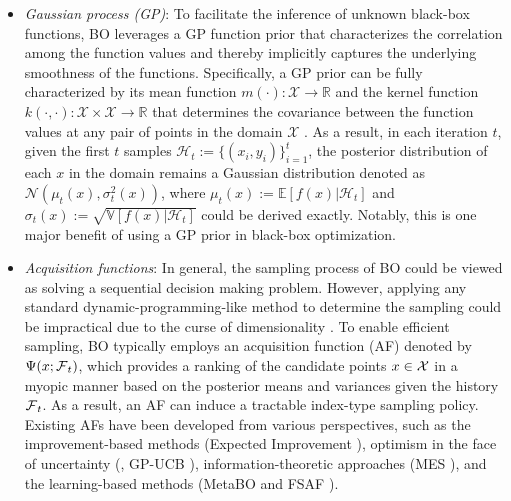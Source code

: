 \begin{itemize}[leftmargin=*]
\item \textit{Gaussian process (GP)}: To facilitate the inference of unknown black-box functions, BO leverages a GP function prior that characterizes the correlation among the function values and thereby implicitly captures the underlying smoothness of the functions. Specifically, a GP prior can be fully characterized by its mean function $m(\cdot): \mathcal{X}\rightarrow \mathbb{R}$ and the kernel function $k(\cdot,\cdot): \mathcal{X}\times \mathcal{X} \rightarrow \mathbb{R}$ that determines the covariance between the function values at any pair of points in the domain $\mathcal{X}$ \citep{schulz2018tutorial}. As a result, in each iteration $t$, given the first $t$ samples $\mathcal{H}_t:=\{(x_i,y_i)\}_{i=1}^{t}$, the posterior distribution of each $x$ in the domain remains a Gaussian distribution denoted as $\mathcal{N}(\mu_t(x),\sigma^2_t(x))$, where $\mu_t(x):=\mathbb{E}[f(x)\rvert \mathcal{H}_t]$ and $\sigma_t(x):=\sqrt{\mathbb{V}[f(x)\rvert \mathcal{H}_t]}$ could be derived exactly.
Notably, this is one major benefit of using a GP prior in black-box optimization.
\vspace{-1mm}
\item \textit{Acquisition functions}: In general, the sampling process of BO could be viewed as solving a sequential decision making problem. However, applying any standard dynamic-programming-like method to determine the sampling could be impractical due to the curse of dimensionality \citep{wang2016bayesian}. To enable efficient sampling, BO typically employs an acquisition function (AF) denoted by $\Psi(x; \operatorname{\mathcal{F}}_t)$, which provides a ranking of the candidate points $x\in \operatorname{\mathcal{X}}$ in a myopic manner based on the posterior means and variances given the history $\operatorname{\mathcal{F}}_t$. As a result, an AF can induce a tractable index-type sampling policy. Existing AFs have been developed from various perspectives, such as the improvement-based methods (\eg Expected Improvement \citep{jones1998efficient}), optimism in the face of uncertainty (\eg, GP-UCB \citep{srinivas2009gaussian}), information-theoretic approaches (\eg MES \citep{wang2017max}), and the learning-based methods (\eg MetaBO \citep{volpp2019meta} and FSAF \citep{hsieh2021reinforced}).
\end{itemize}
